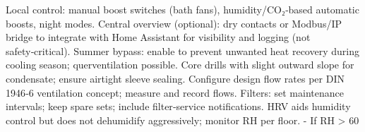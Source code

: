 \markdownRendererUlItem Local control: manual boost switches (bath fans), humidity/CO₂‑based automatic boosts, night modes.\markdownRendererUlItemEnd 
\markdownRendererUlItem Central overview (optional): dry contacts or Modbus/IP bridge to integrate with Home Assistant for visibility and logging (not safety‑critical).\markdownRendererUlItemEnd 
\markdownRendererUlItem Summer bypass: enable to prevent unwanted heat recovery during cooling season; querventilation possible.\markdownRendererUlItemEnd 
\markdownRendererUlEndTight \markdownRendererInterblockSeparator
{}
\markdownRendererSectionEnd \markdownRendererSectionBegin
{}\markdownRendererInterblockSeparator
{}\markdownRendererUlBeginTight
\markdownRendererUlItem Core drills with slight outward slope for condensate; ensure airtight sleeve sealing.\markdownRendererUlItemEnd 
\markdownRendererUlItem Configure design flow rates per DIN 1946‑6 ventilation concept; measure and record flows.\markdownRendererUlItemEnd 
\markdownRendererUlItem Filters: set maintenance intervals; keep spare sets; include filter‑service notifications.\markdownRendererUlItemEnd 
\markdownRendererUlEndTight \markdownRendererInterblockSeparator
{}
\markdownRendererSectionEnd \markdownRendererSectionBegin
{}\markdownRendererInterblockSeparator
{}\markdownRendererUlBegin
\markdownRendererUlItem HRV aids humidity control but does not dehumidify aggressively; monitor RH per floor.\markdownRendererUlItemEnd 
\markdownRendererUlEnd \markdownRendererInterblockSeparator
{}- If RH > 60
\markdownRendererSectionEnd 
\markdownRendererSectionEnd \markdownRendererDocumentEnd